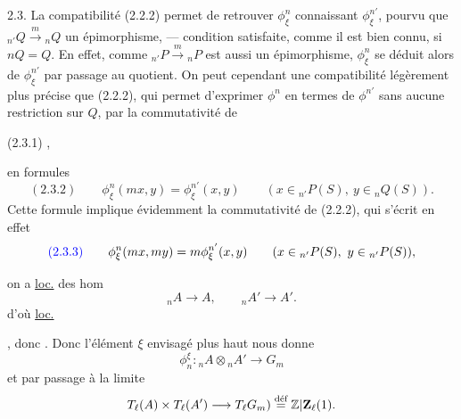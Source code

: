 
2.3.  La compatibilité (2.2.2) permet de retrouver $\phi^n_\xi$ connaissant $\phi^{n'}_\xi$, pourvu que ${}_{n'}Q\xrightarrow{m}{}_nQ$  un épimorphisme, ---  condition satisfaite, comme il est bien connu, si $nQ=Q$. En effet, comme ${}_{n'}P\xrightarrow{m}{}_nP$ est aussi un épimorphisme, $\phi^n_\xi$ se déduit alors de $\phi^{n'}_\xi$ par passage au quotient. On peut cependant  une compatibilité légèrement plus précise que (2.2.2), qui permet d'exprimer $\phi^n$ en termes de $\phi^{n'}$ sans aucune restriction sur $Q$, par la commutativité de

(2.3.1)
,

en formules
\[
(2.3.2)\qquad\phi^n_\xi(mx,y)=\phi^{n'}_\xi(x,y)\qquad(x\in{}_{n'}P(S),\ y\in{}_nQ(S)).
\]
Cette formule implique évidemment la commutativité de (2.2.2), qui s'écrit en effet
\[
\inserted{(2.3.3)}\qquad\phi^n_\xi(mx,my)=m\phi^{n'}_\xi(x,y)\qquad(x\in{}_{n'}P(S),\ y\in{}_{n'}P(S)),
\]



on a \uline{loc.} des hom
\[
{}_nA\longrightarrow A,\qquad{}_nA'\longrightarrow A'.
\]
d'où \uline{loc.} 

, donc . Donc l'élément $\xi$ envisagé plus haut nous donne
\[
\phi_n^\xi:{}_nA\otimes{}_nA'\longrightarrow G_m
\]
et par passage à la limite
\[
T_\ell(A)\times T_\ell(A')\longrightarrow T_\ell G_m)\overset{\text{déf}}{=}\mathbb Z|\mathbf Z_\ell(1).
\]

